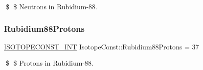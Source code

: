\$ \$ Neutrons in Rubidium-\/88. \mbox{\label{group___isotope_const-_rubidium-_rb88_gaaf1da6d5dd096a270d38a91657e4d3d6}} 
\subsubsection{\texorpdfstring{Rubidium88\+Protons}{Rubidium88Protons}}
{\footnotesize\ttfamily \mbox{\hyperlink{group___isotope_const-_macros_ga5f18360b3e99483a35c32d789e62621c}{I\+S\+O\+T\+O\+P\+E\+C\+O\+N\+S\+T\+\_\+\+I\+NT}} Isotope\+Const\+::\+Rubidium88\+Protons = 37}

\$ \$ Protons in Rubidium-\/88. 